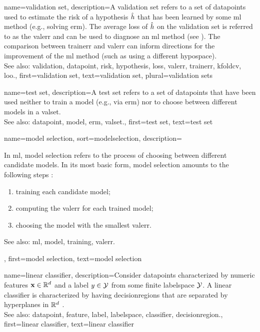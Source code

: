 {name={validation set},
 	description={A \gls{validation} set refers to a set of \glspl{datapoint} used to estimate 
  		the \gls{risk} of a \gls{hypothesis} $\hat{h}$ that has been learned by some 
  		\gls{ml} method (e.g., solving \gls{erm}). The average \gls{loss} of $\hat{h}$ 
  		on the \gls{validation} set is referred to as the \gls{valerr} and can be used to diagnose an 
  		\gls{ml} method (see \cite[Sec. 6.6]{MLBasics}). The comparison between \gls{trainerr} 
  		and \gls{valerr} can inform directions for the improvement of the \gls{ml} method (such as 
  		using a different \gls{hypospace}).
			\\
		See also: \gls{validation}, \gls{datapoint}, \gls{risk}, \gls{hypothesis}, \gls{loss}, \gls{valerr}, \gls{trainerr}, \gls{kfoldcv}, \gls{loo}.},
	first={validation set},
	text={validation set},
	plural={validation sets}
}

{name={test set},
	description={A test set refers to a set of \glspl{datapoint} that have  
		been used neither to train a \gls{model} (e.g., via \gls{erm}) nor 
		to choose between different \glspl{model} in a \gls{valset}.
				\\
		See also: \gls{datapoint}, \gls{model}, \gls{erm}, \gls{valset}.},
	first={test set},
	text={test set}  
}

{name={model selection},
sort={modelselection},
	description={In \gls{ml}, \gls{model} selection refers to the 
		process of choosing between different candidate \glspl{model}. In its most 
		basic form, \gls{model} selection amounts to the following steps \cite[Ch. 6]{MLBasics}: 
		\begin{enumerate}[label=\arabic*)]
			\item \gls{training} each candidate \gls{model}; 
			\item computing the \gls{valerr} for each trained \gls{model}; 
			\item choosing the \gls{model} with the smallest \gls{valerr}. 
		\end{enumerate}
		See also: \gls{ml}, \gls{model}, \gls{training}, \gls{valerr}.},
	first={model selection},
	text={model selection}  
}

{name={linear classifier}, 
	description={Consider \glspl{datapoint} characterized by numeric \glspl{feature} ${\bf x} \in \mathbb{R}^{d}$ 
	    	and a \gls{label} $y \in \mathcal{Y}$ from some finite \gls{labelspace} $\mathcal{Y}$. 
		A linear \gls{classifier} is characterized by having \glspl{decisionregion} that are 
		separated by \glspl{hyperplane} in $\mathbb{R}^{d}$ \cite[Ch. 2]{MLBasics}.
				\\
		See also: \gls{datapoint}, \gls{feature}, \gls{label}, \gls{labelspace}, \gls{classifier}, \gls{decisionregion}.},
	first={linear classifier},
	text={linear classifier} 
}

